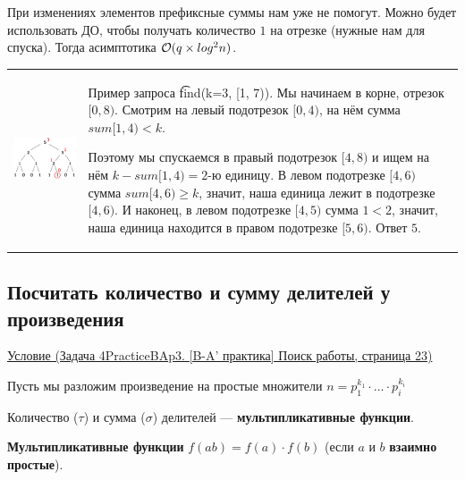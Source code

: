 При изменениях элементов префиксные суммы нам уже не помогут. Можно будет использовать ДО, чтобы получать количество $1$ на отрезке (нужные нам для спуска). Тогда асимптотика $ \mathcal{O}(q \times log^2 n)$. 

\begin{tabular}{cm{}}
	\begin{minipage}{4cm}
		\includegraphics[scale=0.5]{files/k-th.png}
	\end{minipage} 
	&
	Пример запроса \t{find(k=3, [1, 7))}. Мы начинаем в корне, отрезок $[0,8)$. Смотрим на левый подотрезок $[0, 4)$, на нём сумма $sum [1,4) < k$. 
	
	Поэтому мы спускаемся в правый подотрезок $[4,8)$ и ищем на нём $k-sum [1, 4) = 2$-ю единицу. В левом подотрезке $[4,6)$ сумма $sum [4, 6) \ge k$, значит, наша единица лежит в подотрезке $[4,6)$. И наконец, в левом подотрезке $[4,5)$ сумма $1 < 2$, значит, наша единица находится в правом подотрезке $[5,6)$. Ответ $5$.
\end{tabular}

\subsection{Посчитать количество и сумму делителей у произведения}


\href{https://algocode.ru/files/course_summer2020/Tinkoff_Generation_summer_2020_qual.pdf}{Условие (Задача 4PracticeBAp3. [B-A’ практика] Поиск работы, страница 23)}

Пусть мы разложим произведение на простые множители $n = p_1^{k_1} \cdot \ldots \cdot p_i^{k_i}$

Количество ($\tau$) и сумма ($\sigma$) делителей --- {\bf мультипликативные функции}.

{\bf Мультипликативные функции} $f(ab) = f(a) \cdot f(b)$ (если $a$ и $b$ {\bf взаимно простые}). 

